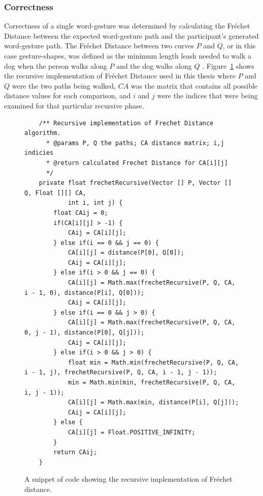 \subsubsection{Correctness} \label{pilot_correctness}
Correctness of a single word-gesture was determined by calculating the Fr\'echet Distance between the expected word-gesture path and the participant's generated word-gesture path. The Fr\'echet Distance between two curves $P$ and $Q$, or in this case gesture-shapes, was defined as the minimum length leash needed to walk a dog when the person walks along $P$ and the dog walks along $Q$ \cite{ref_frechet}. Figure~\ref{code_frechet} shows the recursive implementation of Fr\'echet Distance used in this thesis where $P$ and $Q$ were the two paths being walked, $CA$ was the matrix that contains all possible distance values for each comparison, and $i$ and $j$ were the indices that were being examined for that particular recursive phase.

\begin{figure}[!t] %
	\centering
	\begin{lstlisting}
    /** Recursive implementation of Frechet Distance algorithm.
      * @params P, Q the paths; CA distance matrix; i,j indicies
      * @return calculated Frechet Distance for CA[i][j]
      */
	private float frechetRecursive(Vector [] P, Vector [] Q, Float [][] CA,
	        int i, int j) {
	    float CAij = 0;
	    if(CA[i][j] > -1) {
	        CAij = CA[i][j];
	    } else if(i == 0 && j == 0) {
	        CA[i][j] = distance(P[0], Q[0]);
	        CAij = CA[i][j];
	    } else if(i > 0 && j == 0) {
	        CA[i][j] = Math.max(frechetRecursive(P, Q, CA, i - 1, 0), distance(P[i], Q[0]));
	        CAij = CA[i][j];
	    } else if(i == 0 && j > 0) {
	        CA[i][j] = Math.max(frechetRecursive(P, Q, CA, 0, j - 1), distance(P[0], Q[j]));
	        CAij = CA[i][j];
	    } else if(i > 0 && j > 0) {
	        float min = Math.min(frechetRecursive(P, Q, CA, i - 1, j), frechetRecursive(P, Q, CA, i - 1, j - 1));
	        min = Math.min(min, frechetRecursive(P, Q, CA, i, j - 1));
	        CA[i][j] = Math.max(min, distance(P[i], Q[j]));
	        CAij = CA[i][j];
	    } else {
	        CA[i][j] = Float.POSITIVE_INFINITY;
	    }
	    return CAij;
	}
	\end{lstlisting}
	\caption[Fr\'echet Distance code snippet]{A snippet of code showing the recursive implementation of Fr\'echet distance.}
	\label{code_frechet}
\end{figure}  

